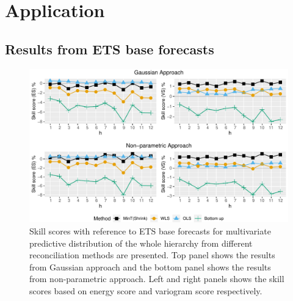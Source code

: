 \documentclass[12pt]{article}
\theoremstyle{definition}
\begin{document}
\section{Application}

\subsection{Results from ETS base forecasts}

\begin{figure}[!hbt]
	\centering
	\small
	\includegraphics[width= .95\textwidth]{Empirical-results/AllTS_MultiVScores_ETS.pdf}
	\caption{Skill scores with reference to ETS base forecasts for multivariate predictive distribution of the whole hierarchy from different reconciliation methods are presented. Top panel shows the results from Gaussian approach and the bottom panel shows the results from non-parametric approach. Left and right panels shows the skill scores based on energy score and variogram score respectively.}\label{fig:EmpResults_AllTS_ETS}
\end{figure}
\end{document}
